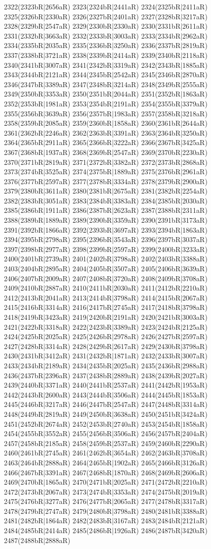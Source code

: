2322(2323bR|2656aR) 2323(2324bR|2441aR) 2324(2325bR|2411aR) 2325(2326bR|2330aR) 2326(2327bR|2401aR) 2327(2328bR|3217aR) 2328(2329bR|2547aR) 2329(2330bR|2330aR) 2330(2331bR|2611aR) 2331(2332bR|3663aR) 2332(2333bR|3003aR) 2333(2334bR|2962aR) 2334(2335bR|2035aR) 2335(2336bR|3250aR) 2336(2337bR|2819aR) 2337(2338bR|3721aR) 2338(2339bR|2414aR) 2339(2340bR|2118aR) 2340(2341bR|3007aR) 2341(2342bR|3319aR) 2342(2343bR|1885aR) 2343(2344bR|2121aR) 2344(2345bR|2542aR) 2345(2346bR|2870aR) 2346(2347bR|3389aR) 2347(2348bR|3214aR) 2348(2349bR|2555aR) 2349(2350bR|3353aR) 2350(2351bR|2044aR) 2351(2352bR|1863aR) 2352(2353bR|1981aR) 2353(2354bR|2191aR) 2354(2355bR|3379aR) 2355(2356bR|3639aR) 2356(2357bR|1983aR) 2357(2358bR|3218aR) 2358(2359bR|2085aR) 2359(2360bR|1858aR) 2360(2361bR|2644aR) 2361(2362bR|2246aR) 2362(2363bR|3391aR) 2363(2364bR|3250aR) 2364(2365bR|2911aR) 2365(2366bR|3222aR) 2366(2367bR|3425aR) 2367(2368bR|1937aR) 2368(2369bR|2547aR) 2369(2370bR|2230aR) 2370(2371bR|2819aR) 2371(2372bR|3382aR) 2372(2373bR|2868aR) 2373(2374bR|3525aR) 2374(2375bR|1889aR) 2375(2376bR|2961aR) 2376(2377bR|2597aR) 2377(2378bR|3334aR) 2378(2379bR|2900aR) 2379(2380bR|3611aR) 2380(2381bR|2675aR) 2381(2382bR|2254aR) 2382(2383bR|3051aR) 2383(2384bR|3383aR) 2384(2385bR|2030aR) 2385(2386bR|1911aR) 2386(2387bR|2623aR) 2387(2388bR|2311aR) 2388(2389bR|1889aR) 2389(2390bR|3359aR) 2390(2391bR|3173aR) 2391(2392bR|1866aR) 2392(2393bR|3697aR) 2393(2394bR|1863aR) 2394(2395bR|2798aR) 2395(2396bR|3543aR) 2396(2397bR|3037aR) 2397(2398bR|2977aR) 2398(2399bR|2597aR) 2399(2400bR|3233aR) 2400(2401bR|2739aR) 2401(2402bR|3798aR) 2402(2403bR|3388aR) 2403(2404bR|2895aR) 2404(2405bR|3507aR) 2405(2406bR|3639aR) 2406(2407bR|2009aR) 2407(2408bR|3720aR) 2408(2409bR|3708aR) 2409(2410bR|2887aR) 2410(2411bR|2030aR) 2411(2412bR|2210aR) 2412(2413bR|2041aR) 2413(2414bR|3798aR) 2414(2415bR|2067aR) 2415(2416bR|3314aR) 2416(2417bR|2745aR) 2417(2418bR|3798aR) 2418(2419bR|3423aR) 2419(2420bR|2191aR) 2420(2421bR|3003aR) 2421(2422bR|3318aR) 2422(2423bR|3389aR) 2423(2424bR|2125aR) 2424(2425bR|2025aR) 2425(2426bR|2978aR) 2426(2427bR|2597aR) 2427(2428bR|3314aR) 2428(2429bR|2617aR) 2429(2430bR|3798aR) 2430(2431bR|3412aR) 2431(2432bR|1871aR) 2432(2433bR|3007aR) 2433(2434bR|2189aR) 2434(2435bR|2025aR) 2435(2436bR|2988aR) 2436(2437bR|2396aR) 2437(2438bR|2889aR) 2438(2439bR|2027aR) 2439(2440bR|3371aR) 2440(2441bR|2537aR) 2441(2442bR|1953aR) 2442(2443bR|2600aR) 2443(2444bR|3506aR) 2444(2445bR|1853aR) 2445(2446bR|3217aR) 2446(2447bR|2547aR) 2447(2448bR|3314aR) 2448(2449bR|2819aR) 2449(2450bR|3638aR) 2450(2451bR|3424aR) 2451(2452bR|2674aR) 2452(2453bR|2740aR) 2453(2454bR|1858aR) 2454(2455bR|3552aR) 2455(2456bR|3506aR) 2456(2457bR|2404aR) 2457(2458bR|2185aR) 2458(2459bR|2537aR) 2459(2460bR|2290aR) 2460(2461bR|2745aR) 2461(2462bR|3654aR) 2462(2463bR|3708aR) 2463(2464bR|2888aR) 2464(2465bR|1902aR) 2465(2466bR|3126aR) 2466(2467bR|3391aR) 2467(2468bR|1870aR) 2468(2469bR|2606aR) 2469(2470bR|1865aR) 2470(2471bR|2025aR) 2471(2472bR|2210aR) 2472(2473bR|2067aR) 2473(2474bR|3353aR) 2474(2475bR|2019aR) 2475(2476bR|3277aR) 2476(2477bR|2065aR) 2477(2478bR|3317aR) 2478(2479bR|2747aR) 2479(2480bR|3798aR) 2480(2481bR|3388aR) 2481(2482bR|1864aR) 2482(2483bR|3167aR) 2483(2484bR|2121aR) 2484(2485bR|2414aR) 2485(2486bR|1926aR) 2486(2487bR|3420aR) 2487(2488bR|2888aR) 